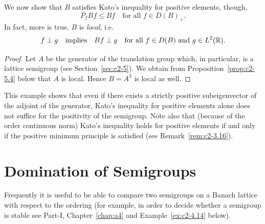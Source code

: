 We now show that $B$ satisfies Kato's inequality for positive elements, though, \ie
\begin{equation}\label{eq:c2-3.20}
P_{f} Bf \leq Bf \quad \text{for all } f \in D(B)_{+}.
\end{equation}
In fact, more is true. $B$ is \emph{local}, i.e.
\begin{equation}\label{eq:c2-3.21}
f \perp g \quad \text{implies} \quad Bf \perp g \quad \text{for all } f \in D(B) \text{ and } g \in L^{2}(\mathbb{R}).
\end{equation}
\begin{proof}
Let $A$ be the generator of the translation group which, in particular, is a lattice semigroup (see Section~\ref{sec:c2-5}). 
We obtain from Proposition~\ref{prop:c2-5.4} below that $A$ is local. 
Hence $B = A^{3}$ is local as well.
\end{proof}
This example shows that even if there exists a strictly positive subeigenvector of the adjoint of the generator, Kato's inequality for positive elements alone does not suffice for the positivity of the semigroup. 
Note also that (because of the order continuous norm) Kato's inequality holds for positive elements if and only if the positive minimum principle is satisfied (see Remark~\ref{rem:c2-3.16}).
\section{Domination of Semigroups} \label{sec:c2-4}
Frequently it is useful to be able to compare two semigroups on a
Banach lattice with respect to the ordering (for example, in order to
decide whether a semigroup is stable see Part-I, Chapter~\ref{chap:a4} and 
Example~\ref{ex:c2-4.14} below).

